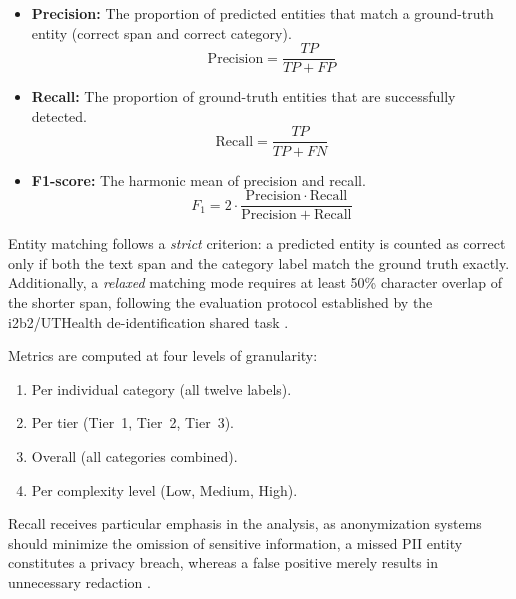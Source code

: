 \begin{itemize}
    \item \textbf{Precision:} The proportion of predicted entities that match
    a ground-truth entity (correct span and correct category).
    \begin{equation}
        \mathrm{Precision} = \frac{\mathit{TP}}{\mathit{TP} + \mathit{FP}}
        \label{eq:precision}
    \end{equation}
    \item \textbf{Recall:} The proportion of ground-truth entities that are
    successfully detected.
    \begin{equation}
        \mathrm{Recall} = \frac{\mathit{TP}}{\mathit{TP} + \mathit{FN}}
        \label{eq:recall}
    \end{equation}
    \item \textbf{F1-score:} The harmonic mean of precision and recall.
    \begin{equation}
        F_1 = 2 \cdot \frac{\mathrm{Precision} \cdot \mathrm{Recall}}
                           {\mathrm{Precision} + \mathrm{Recall}}
        \label{eq:f1}
    \end{equation}
\end{itemize}

Entity matching follows a \emph{strict} criterion: a predicted entity is
counted as correct only if both the text span and the category label match the
ground truth exactly. Additionally, a \emph{relaxed} matching mode requires
at least 50\% character overlap of the shorter span, following the evaluation
protocol established by the i2b2/UTHealth de-identification shared task
\citep{stubbs2015i2b2}. 

Metrics are computed at four levels of granularity:
\begin{enumerate}
    \item Per individual category (all twelve labels).
    \item Per tier (Tier~1, Tier~2, Tier~3).
    \item Overall (all categories combined).
    \item Per complexity level (Low, Medium, High).
\end{enumerate}

Recall receives particular emphasis in the analysis, as anonymization systems
should minimize the omission of sensitive information, a missed PII entity
constitutes a privacy breach, whereas a false positive merely results in
unnecessary redaction \citep{pilan2022tab}.

